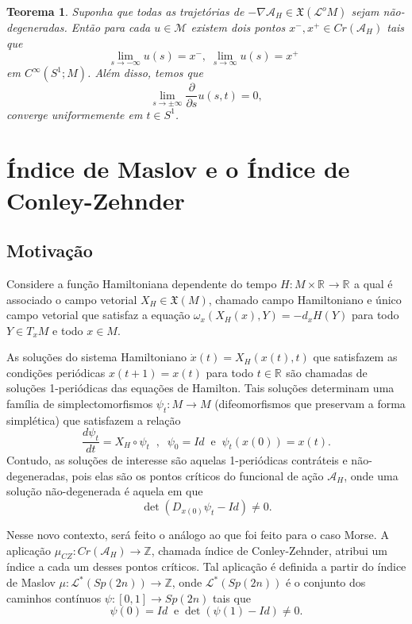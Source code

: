 \documentclass[12pt]{book}
\newtheorem{teorema}{Teorema}[section]
\newcommand{\caminhosespeciais}[1]{\mathcal{L}^{*}(#1)}
\newcommand{\campohamiltoniano}[1]{X_{H}(#1)}
\newcommand{\campohamiltonianoabrev}{X_{H}}
\newcommand{\campossuaves}[1]{\mathfrak{X}(#1)}
\newcommand{\circulo}{S^{1}}
\newcommand{\derivada}[2]{\frac{d #1}{d #2}}
\newcommand{\derivadaparcial}[2]{\frac{\partial #1}{\partial #2}}
\newcommand{\energiafinitaM}{\mathcal{M}}
\newcommand{\espacotangenteponto}[2]{T_{#1}#2}
\newcommand{\funcionalH}{\mathcal{A}_{H}}
\newcommand{\gradientefuncional}{\nabla \funcionalH}
\newcommand{\gruposimpletico}[1]{Sp(#1)}
\newcommand{\iconleyabrev}{\mu_{CZ}}
\newcommand{\inteiros}{\mathbb{Z}}
\newcommand{\intervalo}{[0,1]}
\newcommand{\pontoscriticos}[1]{\textit{Cr}(#1)}
\newcommand{\real}[1]{\mathbb{R}^{#1}}
\newcommand{\reta}{\real{}}
\newcommand{\lacocontrateis}{\mathcal{L}^{o}M}
\begin{document}
	\begin{teorema}\label{teorema_limite_solucoes_energia_finita}
		Suponha que todas as trajetórias de $-\gradientefuncional \in \campossuaves{\lacocontrateis}$ sejam não-degeneradas. Então para cada $u \in \energiafinitaM$ existem dois pontos $x^{-}, x^{+}\in \pontoscriticos{\funcionalH}$ tais que
		$$
		\lim_{s\to -\infty}u(s)=x^{-},\; \lim_{s\to \infty}u(s)=x^{+}\;\;
		$$
		em $C^{\infty}(\circulo;M)$. Além disso, temos que
		$$
		\lim_{s\to \pm \infty}\derivadaparcial{}{s}u(s,t) = 0,
		$$
		converge uniformemente em $t\in \circulo$.
	\end{teorema}
	
	\chapter{Índice de Maslov e o Índice de Conley-Zehnder}
	\section{Motivação}
	Considere a função Hamiltoniana dependente do tempo $H:M\times \reta\to \reta$ a qual é associado o campo vetorial $X_{H} \in \campossuaves{M}$, chamado campo Hamiltoniano e único campo vetorial que satisfaz a equação $\omega_{x}(\campohamiltoniano{x}, Y) = -d_{x}H(Y)$ para todo $Y \in \espacotangenteponto{x}{M}$ e todo $x \in M$. 
	
	As soluções do sistema Hamiltoniano $\dot{x}(t) = X_{H}(x(t), t)$ que satisfazem as condições periódicas $x(t+1) = x(t)$ para todo $t\in \reta$ são chamadas de soluções 1-periódicas das equações de Hamilton. Tais soluções determinam uma família de simplectomorfismos $\psi_{t}:M \to M$ (difeomorfismos que preservam a forma simplética) que satisfazem a relação 
	$$
	\derivada{\psi_{t}}{t}=\campohamiltonianoabrev\circ\psi_{t} \;\;, \;\; \psi_{0}=Id \;\;\text{e}\;\;  \psi_{t}(x(0)) = x(t).
	$$
	Contudo, as soluções de interesse são aquelas 1-periódicas contráteis e não-degeneradas, pois elas são os pontos críticos do funcional de ação $\funcionalH$, onde uma solução não-degenerada é aquela em que 
	$$
	\det(D_{x(0)}\psi_{t} -Id)\neq 0.
	$$
	
	
	Nesse novo contexto, será feito o análogo ao que foi feito para o caso Morse. A aplicação $\iconleyabrev:\pontoscriticos{\funcionalH} \to \inteiros$, chamada índice de Conley-Zehnder, atribui um índice a cada um desses pontos críticos. Tal aplicação é definida a partir do índice de Maslov $\mu:\caminhosespeciais{\gruposimpletico{2n}} \to \inteiros$, onde $\caminhosespeciais{\gruposimpletico{2n}}$ é o conjunto dos caminhos contínuos $\psi:\intervalo \to \gruposimpletico{2n}$ tais que 
	$$
	\psi(0)=Id\;\;\text{e}\;\det(\psi(1)-Id)\neq 0.
	$$
	
\end{document}
